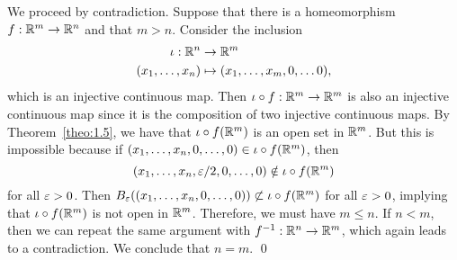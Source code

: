 \begin{pf}
    We proceed by contradiction. Suppose that there is a homeomorphism 
    $f : \mathbb{R}^m \to \mathbb{R}^n$ and that $m > n$. Consider the inclusion 
    \begin{align*}
        \iota : \mathbb{R}^n &\to \mathbb{R}^m \\ 
        (x_1, \dots, x_n) &\mapsto (x_1, \dots, x_m, 0, \dots 0),
    \end{align*} 
    which is an injective continuous map. Then $\iota \circ f : \mathbb{R}^m 
    \to \mathbb{R}^m$ is also an injective continuous map since it is the composition of 
    two injective continuous maps. By Theorem~\ref{theo:1.5}, we have that 
    $\iota \circ f(\mathbb{R}^m)$ is an open set in $\mathbb{R}^m$. But this is impossible 
    because if $(x_1, \dots, x_n, 0, \dots, 0) \in \iota \circ f(\mathbb{R}^m)$, 
    then 
    \[ (x_1, \dots, x_n, \varepsilon/2, 0, \dots, 0) \notin \iota \circ f(\mathbb{R}^m) \]  
    for all $\varepsilon > 0$. Then $B_\varepsilon((x_1, \dots, x_n, 0, \dots, 0)) 
    \not\subset \iota \circ f(\mathbb{R}^m)$ for all $\varepsilon > 0$, implying that 
    $\iota \circ f(\mathbb{R}^m)$ is not open in $\mathbb{R}^m$. Therefore, we must have 
    $m \leq n$. If $n < m$, then we can repeat the same argument with 
    $f^{-1} : \mathbb{R}^n \to \mathbb{R}^m$, which again leads to a contradiction. 
    We conclude that $n = m$. \qed 
\end{pf}\vspace{-0.25cm}

